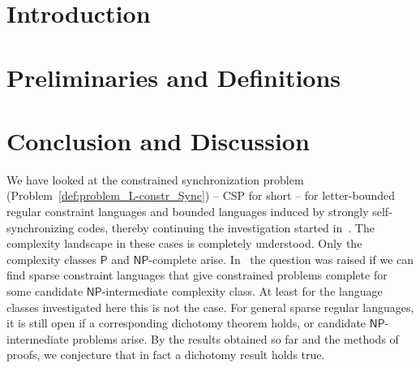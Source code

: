 \documentclass[runningheads,envcountsame]{llncs}
\theoremstyle{plain}
\theoremstyle{definition}
\newcommand{\NP}{\textsf{NP}}
\newcommand{\PTIME}{\textsf{P}}
\begin{document}





\section{Introduction} %
\label{sec:introduction}






\section{Preliminaries and Definitions}
\label{sec:preliminaries}











\section{Conclusion and Discussion}

We have looked at the constrained synchronization problem (Problem~\ref{def:problem_L-constr_Sync}) -- CSP for short -- for letter-bounded regular constraint languages and bounded languages induced by strongly self-synchronizing codes, thereby
continuing the investigation started in~\cite{DBLP:conf/mfcs/FernauGHHVW19}.
The complexity landscape in these cases is completely understood.
Only the complexity classes $\PTIME$ and $\NP$-complete arise.
In~\cite{DBLP:conf/ictcs/Hoffmann20} the question was raised if we can find sparse constraint languages
that give constrained problems complete for some candidate $\NP$-intermediate complexity class. At least for the
language classes investigated here
this is not the case. 
For general sparse regular languages, it is still open if a corresponding
dichotomy theorem holds, or candidate $\NP$-intermediate problems arise. By the results obtained so far and the methods
of proofs, we conjecture that in fact a dichotomy
result holds true.
\end{document}
